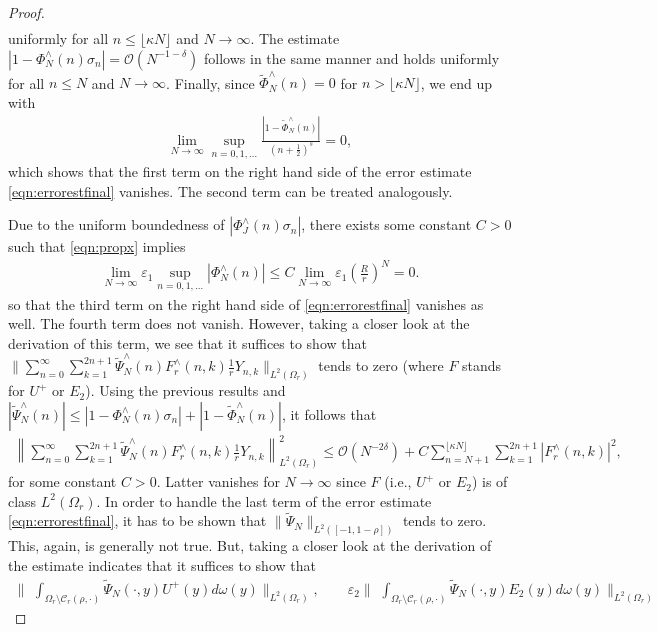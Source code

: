 \documentclass[a4paper, 10pt]{article}
\numberwithin{equation}{section}
\theoremstyle{definition}
\newcommand{\eps}{\ensuremath{\varepsilon}}
\begin{document}
\begin{proof}
\begin{align}
\end{align}
uniformly for all $n\leq \lfloor\kappa N\rfloor$ and $N\to\infty$. The estimate $|1-\Phi_N^\wedge(n)\sigma_n|=\mathcal{O}(N^{-1-\delta})$ follows in the same manner and holds uniformly for all $n\leq N$ and $N\to\infty$. Finally, since $\tilde{\Phi}_{N}^\wedge(n)=0$ for $n> \lfloor\kappa N\rfloor$, we end up with
\begin{align}
\lim_{N\to\infty}\sup_{n=0,1,\ldots}\frac{|1-\tilde{\Phi}_{N}^\wedge(n)|}{(n+\frac{1}{2})^{s}}=0,
\end{align}
which shows that the first term on the right hand side of the error estimate \eqref{eqn:errorestfinal} vanishes. The second term can be treated analogously. 

Due to the uniform boundedness of $|\Phi_J^\wedge(n)\sigma_n|$, there exists some constant $C>0$ such that \eqref{eqn:propx} implies
\begin{align}
\lim_{N\to\infty}\eps_1\sup_{n=0,1,\ldots}\left|\Phi_N^\wedge(n)\right|\leq C\lim_{N\to\infty}\eps_1\left(\frac{R}{r}\right)^{N}=0.
\end{align}
so that the third term on the right hand side of \eqref{eqn:errorestfinal} vanishes as well. The fourth term does not vanish. However, taking a closer look at the derivation of this term, we see that it suffices to show that $\big\|\sum_{n=0}^\infty\sum_{k=1}^{2n+1}\tilde{\Psi}_{N}^\wedge(n)F_r^\wedge(n,k)\frac{1}{r}Y_{n,k}\big\|_{L^2(\Omega_r)}$ tends to zero (where $F$ stands for $U^+$ or $E_2$). Using the previous results and $|\tilde{\Psi}_N^\wedge(n)|\leq |1-{\Phi}_N^\wedge(n)\sigma_n|+|1-\tilde{\Phi}_N^\wedge(n)|$, it follows that
\begin{align}
\left\|\sum_{n=0}^\infty\sum_{k=1}^{2n+1}\tilde{\Psi}_{N}^\wedge(n)F_r^\wedge(n,k)\frac{1}{r}Y_{n,k}\right\|_{L^2(\Omega_r)}^2\leq \mathcal{O}(N^{-2\delta})+C\sum_{n=N+1}^{\lfloor \kappa N\rfloor}\sum_{k=1}^{2n+1}\left|F_r^\wedge(n,k)\right|^2,
\end{align}
for some constant $C>0$. Latter vanishes for $N\to\infty$ since $F$ (i.e., $U^+$ or $E_2$) is of class $L^2(\Omega_r)$. In order to handle the last term of the error estimate \eqref{eqn:errorestfinal}, it has to be shown that $\|\tilde{\Psi}_N\|_{L^2([-1,1-\rho])}$ tends to zero. This, again, is generally not true. But, taking a closer look at the derivation of the estimate indicates that it suffices to show that
\small\begin{align}\label{eqn:altterms}
\Bigg\|\,\,\int_{\Omega_r\setminus\mathcal{C}_r(\rho,\cdot)}\tilde{\Psi}_{N}(\cdot,y) U^+(y)d\omega(y)\Bigg\|_{L^2(\Omega_r)}, \qquad \eps_2\Bigg\|\,\,\int_{\Omega_r\setminus\mathcal{C}_r(\rho,\cdot)}\tilde{\Psi}_{N}(\cdot,y) E_2(y)d\omega(y)\Bigg\|_{L^2(\Omega_r)}

\end{align}
\end{proof}
\end{document}

